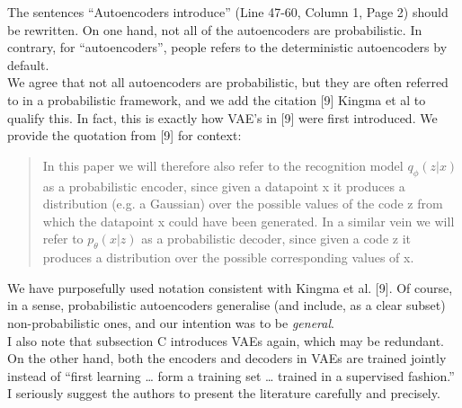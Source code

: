 \documentclass{article}
\begin{document}
{\color{blue}
The sentences ``Autoencoders introduce'' (Line 47-60, Column 1, Page 2) should be rewritten. On one hand, not all of the autoencoders are probabilistic. In contrary, for ``autoencoders'', people refers to the deterministic autoencoders by default.}\\

We agree that not all autoencoders are probabilistic, but they are often referred to in a probabilistic framework, and we add the citation [9] Kingma et al to qualify this. In fact, this is exactly how VAE's in [9] were first introduced.  We provide the quotation from [9] for context:
    
    \begin{quote}
       In this paper we will therefore also refer to the recognition model $q_\phi(z|x)$ as a probabilistic encoder, since given a datapoint x it produces a distribution (e.g. a Gaussian) over the possible values of the code z from which the datapoint x could have been generated. In a similar vein we will refer to $p_\theta(x|z)$ as a probabilistic decoder, since given a code z it produces a distribution over the possible corresponding values of x.
    \end{quote}

We have purposefully used notation consistent with Kingma et al. [9]. Of course, in a sense, probabilistic autoencoders generalise (and include, as a clear subset) non-probabilistic ones, and our intention was to be {\em general}. \\

 {\color{blue}I also note that subsection C introduces VAEs again, which may be redundant. On the other hand, both the encoders and decoders in VAEs are trained jointly instead of ``first learning … form a training set … trained in a supervised fashion.'' I seriously suggest the authors to present the literature carefully and precisely.}\\
\end{document}
